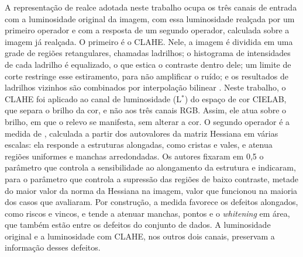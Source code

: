 \documentclass[
    12pt,                %
    openright,           %
    oneside,             %
    a4paper,             %
    english,             %
    brazil               %
]{abntex2}
\begin{document}
A representação de realce adotada neste trabalho ocupa os três canais
de entrada com a luminosidade original da imagem, com essa luminosidade
realçada por um primeiro operador e com a resposta de um segundo
operador, calculada sobre a imagem já realçada. O primeiro
é o CLAHE. Nele, a imagem é dividida em uma grade de regiões
retangulares, chamadas ladrilhos; o histograma de intensidades de cada
ladrilho é equalizado, o que estica o contraste dentro dele; um limite
de corte restringe esse estiramento, para não amplificar o ruído; e os
resultados de ladrilhos vizinhos são combinados por interpolação
bilinear \cite{Jiang2023}. Neste trabalho, o CLAHE foi aplicado ao
canal de luminosidade (L$^*$) do espaço de cor CIELAB, que separa o brilho
da cor, e não aos três canais RGB. Assim, ele atua sobre o brilho, em
que o relevo se manifesta, sem alterar a cor. O segundo operador é a
medida de , calculada a partir dos autovalores
da matriz Hessiana em várias escalas: ela responde a estruturas
alongadas, como cristas e vales, e atenua regiões uniformes e manchas
arredondadas. Os autores fixaram em 0,5 o parâmetro que controla a
sensibilidade ao alongamento da estrutura e indicaram, para o
parâmetro que controla a supressão das regiões de baixo contraste,
metade do maior valor da norma da Hessiana na imagem, valor que
funcionou na maioria dos casos que avaliaram. Por construção, a medida favorece os defeitos
alongados, como riscos e vincos, e tende a atenuar manchas, pontos e o
\textit{whitening} em área, que também estão entre os defeitos do
conjunto de dados. A luminosidade original e a luminosidade com CLAHE, nos
outros dois canais, preservam a informação desses defeitos.
\end{document}
